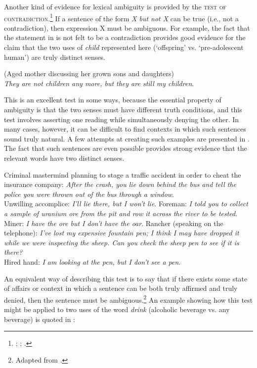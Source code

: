 Another kind of evidence for lexical ambiguity is provided by the \textsc{test of contradiction}.\footnote{\citet{Quine1960}; \citet{ZwickySadock1975}; \citet{Kennedy2011}.} If a sentence of the form \textit{X but not X} can be true (i.e., not a contradiction), then expression X must be ambiguous. For example, the fact that the statement in  is not felt to be a contradiction provides good evidence for the claim that the two uses of \textit{child} represented here (‘offspring’ vs. ‘pre-adolescent human’) are truly distinct senses.


\ea \label{ex:5.10}
(Aged mother discussing her grown sons and daughters)\\
\textit{They are not children any more, but they are still my children}.
\z


This is an excellent test in some ways, because the essential property of ambiguity is that the two senses must have different truth conditions, and this test involves asserting one reading while simultaneously denying the other. In many cases, however, it can be difficult to find contexts in which such sentences sound truly natural. A few attempts at creating such examples are presented in . The fact that such sentences are even possible provides strong evidence that the relevant words have two distinct senses.


\ea \label{ex:5.11}
\ea  Criminal mastermind planning to stage a traffic accident in order to cheat the insurance company: \textit{After the crash, you lie down behind the bus and tell the police you were thrown out of the bus through a window}.\\
Unwilling accomplice: \textit{I’ll lie there, but I won’t lie}.
\ex   Foreman: \textit{I told you to collect a sample of uranium ore from the pit and row it across the river to be tested}.\\
Miner: \textit{I have the ore but I don’t have the oar}.
\ex   Rancher (speaking on the telephone): \textit{I’ve lost my expensive fountain pen; I think I may have dropped it while we were inspecting the sheep. Can you check the sheep pen to see if it is there?}\\
Hired hand: \textit{I am looking at the pen, but I don’t see a pen}.
\z \z


An equivalent way of describing this test is to say that if there exists some state of affairs or context in which a sentence can be both truly affirmed and truly denied, then the sentence must be ambiguous.\footnote{Adapted from \citet[407]{Gillon1990}.} An example showing how this test might be applied to two uses of the word \textit{drink} (alcoholic beverage vs. any beverage) is quoted in :


